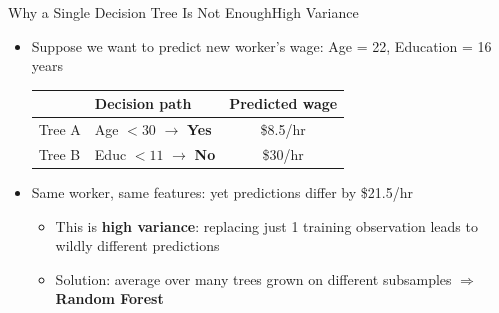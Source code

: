 \documentclass[hyperref={pdfpagelabels=false}]{beamer}
\begin{document}
\begin{frame}{Why a Single Decision Tree Is Not Enough}{High Variance}
\begin{itemize}

\item Suppose we want to predict new worker's wage: Age = 22, Education = 16 years
\vspace{0.2cm}

\begin{center}
 
  \small
  \begin{tabular}{@{}llc@{}}
    \toprule
     & Decision path & Predicted wage \\
    \midrule
    Tree A & Age $< 30$ $\to$ \textbf{Yes} & \$8.5/hr \\
    Tree B & Educ $< 11$ $\to$ \textbf{No} & \$30/hr \\
    \bottomrule
  \end{tabular}
\end{center}

\vspace{0.2cm}

  \item Same worker, same features: yet predictions differ by \$21.5/hr
  \begin{itemize}

  \vspace{0.2cm}

  \item This is \textbf{high variance}: replacing just 1 training observation leads to wildly different predictions
  \vspace{0.2cm}

  \item Solution: average over many trees grown on different subsamples $\Rightarrow$ \textbf{Random Forest}
  \end{itemize}

\end{itemize}
\end{frame}
\end{document}
